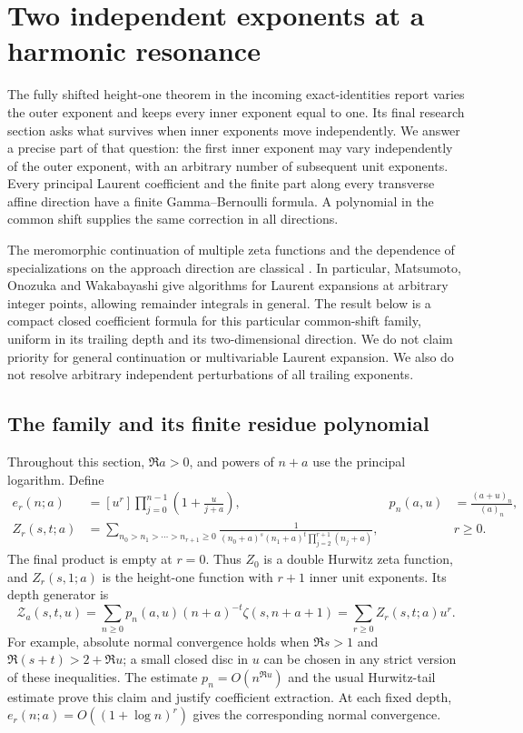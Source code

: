 \section{Two independent exponents at a harmonic resonance}
\label{h2:sec:main}

The fully shifted height-one theorem in the incoming exact-identities
report varies the outer exponent and keeps every inner exponent equal
to one. Its final research section asks what survives when inner
exponents move independently. We answer a precise part of that question:
the first inner exponent may vary independently of the outer exponent,
with an arbitrary number of subsequent unit exponents. Every principal
Laurent coefficient and the finite part along every transverse affine
direction have a finite Gamma--Bernoulli formula. A polynomial in the
common shift supplies the same correction in all directions.

The meromorphic continuation of multiple zeta functions and the
dependence of specializations on the approach direction are classical
\cite{h2:AET,h2:MOW}. In particular, Matsumoto, Onozuka and Wakabayashi
give algorithms for Laurent expansions at arbitrary integer points,
allowing remainder integrals in general. The result below is a compact
closed coefficient formula for this particular common-shift family,
uniform in its trailing depth and its two-dimensional direction. We do
not claim priority for general continuation or multivariable Laurent
expansion. We also do not resolve arbitrary independent perturbations of
all trailing exponents.

\subsection{The family and its finite residue polynomial}

Throughout this section, $\Re a>0$, and powers of $n+a$ use the principal
logarithm. Define
\begin{align}
 e_r(n;a)&=[u^r]\prod_{j=0}^{n-1}\left(1+\frac{u}{j+a}\right),
 &p_n(a,u)&=\frac{(a+u)_n}{(a)_n},\label{h2:eq:e}\\
 Z_r(s,t;a)&=\sum_{n_0>n_1>\cdots>n_{r+1}\ge0}
 \frac{1}{(n_0+a)^s(n_1+a)^t\prod_{j=2}^{r+1}(n_j+a)},
 &&r\ge0.\label{h2:eq:Z}
\end{align}
The final product is empty at $r=0$. Thus $Z_0$ is a double Hurwitz
zeta function, and $Z_r(s,1;a)$ is the height-one function with $r+1$
inner unit exponents. Its depth generator is
\begin{equation}\label{h2:eq:generator}
 \mathcal Z_a(s,t,u)=\sum_{n\ge0}
     p_n(a,u)(n+a)^{-t}\zeta(s,n+a+1)
       =\sum_{r\ge0}Z_r(s,t;a)u^r.
\end{equation}
For example, absolute normal convergence holds when
$\Re s>1$ and $\Re(s+t)>2+\Re u$; a small closed disc in $u$
can be chosen in any strict version of these inequalities. The estimate
$p_n=O(n^{\Re u})$ and the usual Hurwitz-tail estimate prove this
claim and justify coefficient extraction. At each fixed depth,
$e_r(n;a)=O((1+\log n)^r)$ gives the corresponding normal convergence.

